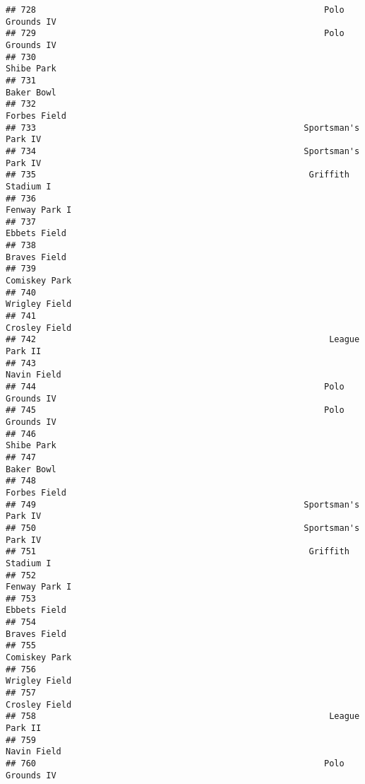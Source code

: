 \documentclass[]{article}
\begin{document}
\begin{verbatim}
## 728                                                         Polo Grounds IV
## 729                                                         Polo Grounds IV
## 730                                                              Shibe Park
## 731                                                              Baker Bowl
## 732                                                            Forbes Field
## 733                                                     Sportsman's Park IV
## 734                                                     Sportsman's Park IV
## 735                                                      Griffith Stadium I
## 736                                                           Fenway Park I
## 737                                                            Ebbets Field
## 738                                                            Braves Field
## 739                                                           Comiskey Park
## 740                                                           Wrigley Field
## 741                                                           Crosley Field
## 742                                                          League Park II
## 743                                                             Navin Field
## 744                                                         Polo Grounds IV
## 745                                                         Polo Grounds IV
## 746                                                              Shibe Park
## 747                                                              Baker Bowl
## 748                                                            Forbes Field
## 749                                                     Sportsman's Park IV
## 750                                                     Sportsman's Park IV
## 751                                                      Griffith Stadium I
## 752                                                           Fenway Park I
## 753                                                            Ebbets Field
## 754                                                            Braves Field
## 755                                                           Comiskey Park
## 756                                                           Wrigley Field
## 757                                                           Crosley Field
## 758                                                          League Park II
## 759                                                             Navin Field
## 760                                                         Polo Grounds IV

\end{verbatim}
\end{document}

